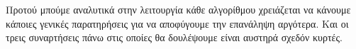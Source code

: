 Προτού μπούμε αναλυτικά στην λειτουργία κάθε αλγορίθμου χρειάζεται να κάνουμε κάποιες γενικές
παρατηρήσεις για να αποφύγουμε την επανάληψη αργότερα. Και οι τρεις συναρτήσεις πάνω στις οποίες
θα δουλέψουμε είναι αυστηρά σχεδόν κυρτές.  
